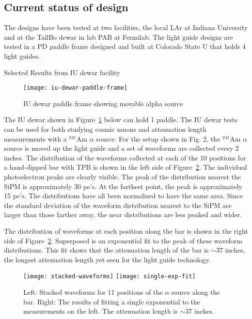 \subsection{Current status of design}

The designs have been tested at two facilities, the local LAr at
Indiana University and at the TallBo dewar in lab PAB at Fermilab.
The light guide designs are tested in a PD paddle frame designed and
built at Colorado State U that holds 4 light guides.

Selected Results from IU dewar facility

\begin{figure}[htbp]
\centering
\texttt{[image: iu-dewar-paddle-frame]}
\caption{IU dewar paddle frame showing movable alpha source}
\label{fig:iu-dewar-paddle-frame}
\end{figure}

The IU dewar shown in Figure~\ref{fig:iu-dewar-paddle-frame} below can
hold 1 paddle.  The IU dewar tests can be used for both studying
cosmic muons and attenuation length measurements with a $^{241}$Am
$\alpha$ source.  For the setup shown in Fig. 2, the $^{241}$Am
$\alpha$ source is moved up the light guide and a set of waveforms are
collected every 2 inches.  The distribution of the waveforms collected
at each of the 10 positions for a hand-dipped bar with TPB is shown in
the left side of Figure~\ref{fig:waveforms-and-fit}.  The individual
photoelectron peaks are clearly visible.  The peak of the distribution
nearest the SiPM is approximately 30 pe's.  At the farthest point, the
peak is approximately 15 pe's.  The distributions have all been
normalized to have the same area.  Since the standard deviation of the
waveform distribution nearest to the SiPM are larger than those
farther away, the near distributions are less peaked and wider.

The distribution of waveforms at each position along the bar is shown in the right side of Figure~\ref{fig:waveforms-and-fit}.  Superposed is an exponential fit to the peak of these waveform distributions.  This fit shows that the attenuation length of the bar is $\sim$37 inches, the longest attenuation length yet seen for the light guide technology. 
\begin{figure}[htbp]
\centering
\texttt{[image: stacked-waveforms]}
\texttt{[image: single-exp-fit]}
\caption{Left: Stacked waveforms for 11 positions of the $\alpha$ source along the bar. Right: The results of fitting a single exponential to the measurements on the left.  The attenuation length is $\sim$37 inches. }
\label{fig:waveforms-and-fit}
\end{figure}


